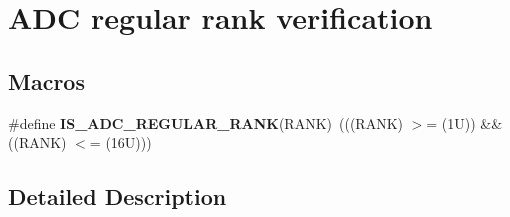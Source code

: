 \hypertarget{group___a_d_c__regular__rank__verification}{}\section{A\+DC regular rank verification}
\label{group___a_d_c__regular__rank__verification}
\subsection*{Macros}
\begin{DoxyCompactItemize}
\item 
\mbox{\label{group___a_d_c__regular__rank__verification_ga5928a1e9315f798e27220b91f1bae7f2}} 
\#define {\bfseries I\+S\+\_\+\+A\+D\+C\+\_\+\+R\+E\+G\+U\+L\+A\+R\+\_\+\+R\+A\+NK}(R\+A\+NK)~(((R\+A\+NK) $>$= (1\+U)) \&\& ((\+R\+A\+N\+K) $<$= (16\+U)))
\end{DoxyCompactItemize}


\subsection{Detailed Description}
